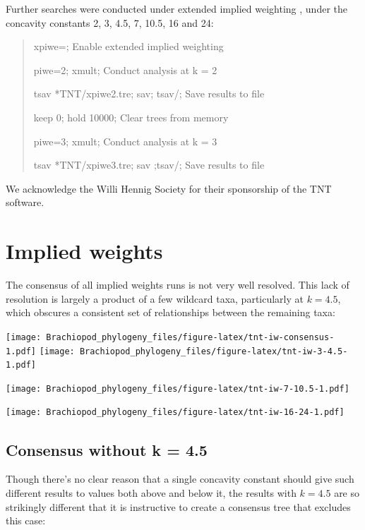 \documentclass[]{book}
\theoremstyle{definition}
\theoremstyle{definition}
\theoremstyle{definition}
\theoremstyle{remark}
\begin{document}
Further searches were conducted under extended implied weighting
\citep{Goloboff1997, Goloboff2014}, under the concavity constants 2, 3,
4.5, 7, 10.5, 16 and 24:

\begin{quote}
xpiwe=; {Enable extended implied weighting}

piwe=2; xmult; {Conduct analysis at k = 2}

tsav *TNT/xpiwe2.tre; sav; tsav/; {Save results to file}

keep 0; hold 10000; {Clear trees from memory}

piwe=3; xmult; {Conduct analysis at k = 3}

tsav *TNT/xpiwe3.tre; sav ;tsav/; {Save results to file}
\end{quote}

We acknowledge the Willi Hennig Society for their sponsorship of the TNT
software.

\hypertarget{implied-weights}{%
\section{Implied weights}\label{implied-weights}}

The consensus of all implied weights runs is not very well resolved.
This lack of resolution is largely a product of a few wildcard taxa,
particularly at \(k = 4.5\), which obscures a consistent set of
relationships between the remaining taxa:

\texttt{[image: Brachiopod\_phylogeny\_files/figure-latex/tnt-iw-consensus-1.pdf]}
\texttt{[image: Brachiopod\_phylogeny\_files/figure-latex/tnt-iw-3-4.5-1.pdf]}

\texttt{[image: Brachiopod\_phylogeny\_files/figure-latex/tnt-iw-7-10.5-1.pdf]}

\texttt{[image: Brachiopod\_phylogeny\_files/figure-latex/tnt-iw-16-24-1.pdf]}

\hypertarget{consensus-without-k-4.5}{%
\subsection{Consensus without k = 4.5}\label{consensus-without-k-4.5}}

Though there's no clear reason that a single concavity constant should
give such different results to values both above and below it, the
results with \(k = 4.5\) are so strikingly different that it is
instructive to create a consensus tree that excludes this case:
\end{document}
